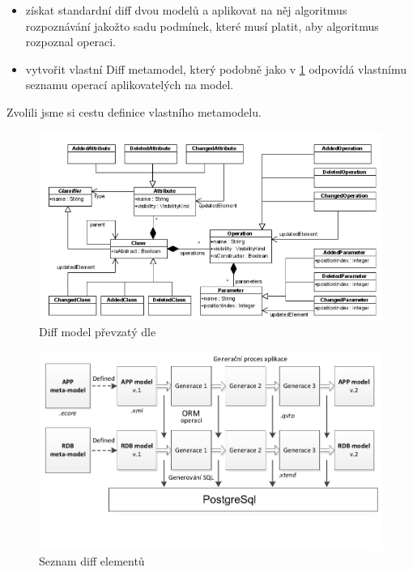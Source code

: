 \documentclass[11pt,twoside,a4paper]{book}
\begin{document}
\begin{itemize}
  	\item získat standardní diff dvou modelů a aplikovat na něj algoritmus
  	rozpoznávání jakožto sadu podmínek, které musí platit, aby algoritmus rozpoznal operaci.
	\item vytvořit vlastní Diff metamodel, který podobně jako v
	\ref{fig:diff_cincetti} odpovídá vlastnímu seznamu operací aplikovatelých na
	model.
\end{itemize}

Zvolili jsme si cestu definice vlastního metamodelu.

\begin{figure}[H]
\begin{center}
\includegraphics[width=15cm]{figures/uml_diference_cincetti}
\caption{Diff model převzatý dle \cite{Cincetti}}
\label{fig:diff_cincetti}
\end{center}
\end{figure}

\begin{figure}[H]
\begin{center}
\includegraphics[width=15cm]{figures/framework_structura_tarant_modified}
\caption{Seznam diff elementů}
\label{fig:diff_meta}
\end{center}
\end{figure}
\end{document}
